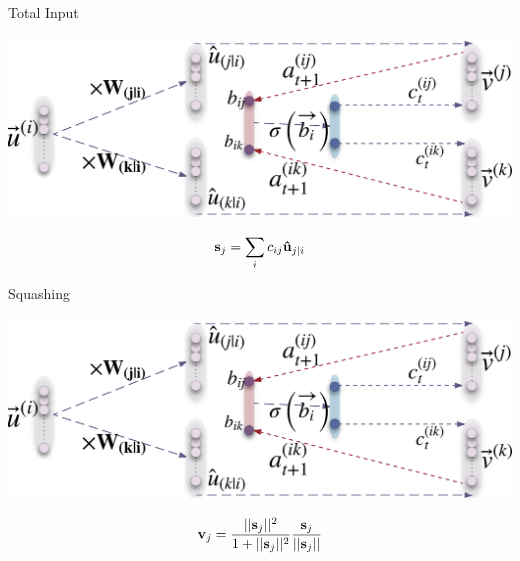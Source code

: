 \documentclass{beamer}
\begin{document}
{    \begin{frame}{Total Input}
      \begin{center}
        \includegraphics[width=.6\textwidth]{../img/capsRouting.png}
      \end{center}

      \begin{equation}
        {\bf s}_j = \sum_i c_{ij} {\bf \hat{u}}_{j|i}
        \label{eq:total-input}
      \end{equation}
    \end{frame}

    \begin{frame}{Squashing}
      \begin{center}
        \includegraphics[width=.6\textwidth]{../img/capsRouting.png}
      \end{center}

      \begin{equation}
        {\bf v}_j = \frac{||{\bf s}_j||^2}{1+||{\bf s}_j||^2} \frac{{\bf s}_j}{||{\bf s}_j||}
        \label{eq:squash}
      \end{equation}
      \pause
    \end{frame}
  }
\end{document}
